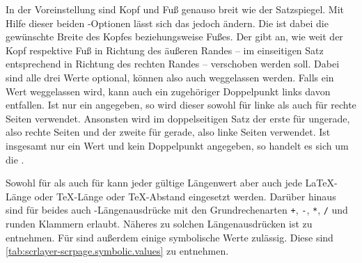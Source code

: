\begin{Declaration}
\end{Declaration}
In der Voreinstellung sind Kopf und
Fuß genauso breit wie der Satzspiegel. Mit Hilfe dieser
beiden \KOMAScript-Optionen lässt sich das jedoch ändern. Die 
ist dabei die gewünschte Breite des Kopfes beziehungsweise Fußes. Der
 gibt an, wie weit der Kopf respektive Fuß in Richtung des
äußeren Randes -- im einseitigen Satz entsprechend in Richtung des rechten
Randes -- verschoben werden soll. Dabei sind alle
drei Werte optional, können also
auch weggelassen werden. Falls ein Wert weggelassen wird, kann auch ein
zugehöriger Doppelpunkt links davon entfallen. Ist nur ein 
angegeben, so wird dieser sowohl für linke als auch für rechte Seiten
verwendet. Ansonsten wird im doppelseitigen Satz der erste  für
ungerade, also rechte Seiten und der zweite für gerade, also linke Seiten
verwendet. Ist insgesamt nur ein Wert und kein Doppelpunkt angegeben, so
handelt es sich um die .

Sowohl für  als auch für  kann jeder gültige
Längenwert aber auch jede \LaTeX-Länge oder \TeX-Länge oder \TeX-Abstand
eingesetzt werden. Darüber hinaus sind für beides auch \eTeX-Längen\-ausdrücke
mit den Grundrechenarten \texttt{+}, \texttt{-}, \texttt{*}, \texttt{/} und
runden Klammern erlaubt. Näheres zu solchen Längenausdrücken ist
\cite[Abschnitt~3.5]{manual:eTeX} zu entnehmen. Für  sind
außerdem einige symbolische Werte zulässig. Diese sind
\autoref{tab:scrlayer-scrpage.symbolic.values} zu entnehmen.


